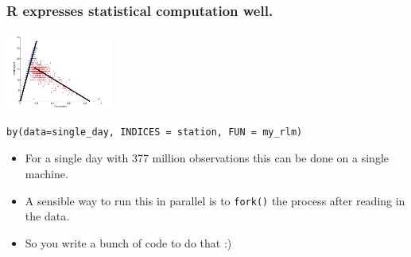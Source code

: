 \documentclass{beamer}
\begin{document}
\begin{frame}[fragile]

    \frametitle{R expresses statistical computation well.}


\centerline{\includegraphics[height=1in]{fundamental_diagram.png}}

\begin{verbatim}
by(data=single_day, INDICES = station, FUN = my_rlm)
\end{verbatim}

    \begin{itemize}
        \item For a single day with 377 million observations this can be
            done on a single machine.
        \item A sensible way to run this in parallel is to \texttt{fork()}
            the process after reading in the data.
        \item So you write a bunch of code to do that :)
    \end{itemize}

\end{frame}
\end{document}
